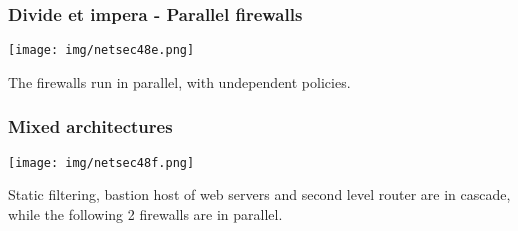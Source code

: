 \documentclass[a4paper, 10pt, titlepage]{article}
\begin{document}
\subsubsection*{Divide et impera - Parallel firewalls}
\begin{center}
	\texttt{[image: img/netsec48e.png]}
\end{center}
The firewalls run in parallel, with undependent policies.

\subsubsection*{Mixed architectures}
\begin{center}
	\texttt{[image: img/netsec48f.png]}
\end{center}
Static filtering, bastion host of web servers and second level router are in cascade, while the following 2 firewalls are in parallel.

\newpage
\end{document}
